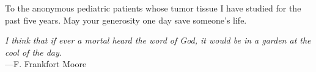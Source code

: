 %
\begin{frontmatter}

%
%
\makefrontmatter

%
%
%
%
%
%
\begin{dedication}
To the anonymous pediatric patients whose tumor tissue I have studied for the past five years. May your generosity one day save someone's life.
\end{dedication}


%
%



%
%
\begin{epigraph} %
  \emph{I think that if ever a mortal heard the word of God, it would be in a garden at the cool of the day.}\\
  ---F. Frankfort Moore
\end{epigraph}

%
\tableofcontents

\newpage
{}
\begin{center}\expandafter\MakeUppercase\expandafter{\abbrevtitle}\end{center}
\let\clearpage\relax
\vspace*{-2cm}
\printglossary[type=\acronymtype,title={}]



\end{frontmatter}
